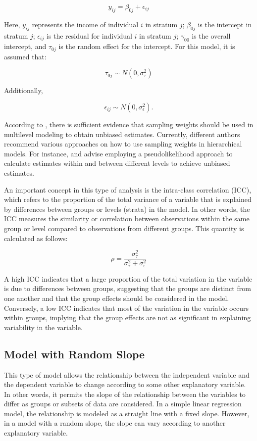 \documentclass[
  12pt,
]{book}
\begin{document}
\[
y_{ij} = \beta_{0j} + \epsilon_{ij}
\]

Here, \(y_{ij}\) represents the income of individual \(i\) in stratum \(j\); \(\beta_{0j}\) is the intercept in stratum \(j\); \(\epsilon_{ij}\) is the residual for individual \(i\) in stratum \(j\); \(\gamma_{00}\) is the overall intercept, and \(\tau_{0j}\) is the random effect for the intercept. For this model, it is assumed that:

\[
\tau_{0j} \sim N(0, \sigma_{\tau}^{2})
\]

Additionally,

\[
\epsilon_{ij} \sim N(0, \sigma_{\epsilon}^{2}).
\]

According to \citet{cai2013investigation}, there is sufficient evidence that sampling weights should be used in multilevel modeling to obtain unbiased estimates. Currently, different authors recommend various approaches on how to use sampling weights in hierarchical models. For instance, \citet{pfeffermann1998weighting} and \citet{asparouhov2006general} advise employing a pseudolikelihood approach to calculate estimates within and between different levels to achieve unbiased estimates.

An important concept in this type of analysis is the intra-class correlation (ICC), which refers to the proportion of the total variance of a variable that is explained by differences between groups or levels (strata) in the model. In other words, the ICC measures the similarity or correlation between observations within the same group or level compared to observations from different groups. This quantity is calculated as follows:

\[
\rho = \frac{\sigma_{\tau}^{2}}{\sigma_{\tau}^{2} + \sigma_{\epsilon}^{2}}
\]

A high ICC indicates that a large proportion of the total variation in the variable is due to differences between groups, suggesting that the groups are distinct from one another and that the group effects should be considered in the model. Conversely, a low ICC indicates that most of the variation in the variable occurs within groups, implying that the group effects are not as significant in explaining variability in the variable.

\subsection{Model with Random Slope}\label{model-with-random-slope}

This type of model allows the relationship between the independent variable and the dependent variable to change according to some other explanatory variable. In other words, it permits the slope of the relationship between the variables to differ as groups or subsets of data are considered. In a simple linear regression model, the relationship is modeled as a straight line with a fixed slope. However, in a model with a random slope, the slope can vary according to another explanatory variable.
\end{document}
